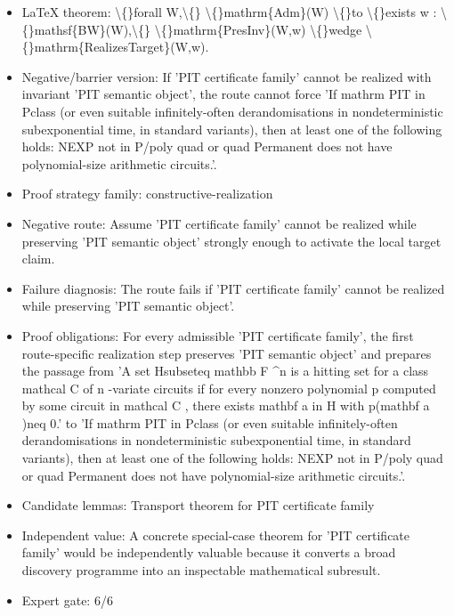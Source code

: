 \documentclass[11pt]{article}
\begin{document}
\begin{itemize}
\item LaTeX theorem: \textbackslash\{\}forall W,\textbackslash\{\} \textbackslash\{\}mathrm\{Adm\}(W) \textbackslash\{\}to \textbackslash\{\}exists w : \textbackslash\{\}mathsf\{BW\}(W),\textbackslash\{\} \textbackslash\{\}mathrm\{PresInv\}(W,w) \textbackslash\{\}wedge \textbackslash\{\}mathrm\{RealizesTarget\}(W,w).
\item Negative/barrier version: If 'PIT certificate family' cannot be realized with invariant 'PIT semantic object', the route cannot force 'If mathrm PIT in Pclass (or even suitable infinitely-often derandomisations in nondeterministic subexponential time, in standard variants), then at least one of the following holds: NEXP not in P/poly quad or quad Permanent does not have polynomial-size arithmetic circuits.'.
\item Proof strategy family: constructive-realization
\item Negative route: Assume 'PIT certificate family' cannot be realized while preserving 'PIT semantic object' strongly enough to activate the local target claim.
\item Failure diagnosis: The route fails if 'PIT certificate family' cannot be realized while preserving 'PIT semantic object'.
\item Proof obligations: For every admissible 'PIT certificate family', the first route-specific realization step preserves 'PIT semantic object' and prepares the passage from 'A set Hsubseteq mathbb F \textasciicircum{}n is a hitting set for a class mathcal C of n -variate circuits if for every nonzero polynomial p computed by some circuit in mathcal C , there exists mathbf a in H with p(mathbf a )neq 0.' to 'If mathrm PIT in Pclass (or even suitable infinitely-often derandomisations in nondeterministic subexponential time, in standard variants), then at least one of the following holds: NEXP not in P/poly quad or quad Permanent does not have polynomial-size arithmetic circuits.'.
\item Candidate lemmas: Transport theorem for PIT certificate family
\item Independent value: A concrete special-case theorem for 'PIT certificate family' would be independently valuable because it converts a broad discovery programme into an inspectable mathematical subresult.
\item Expert gate: 6/6
\end{itemize}
\end{document}
